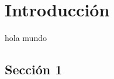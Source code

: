 \chapter{Introducción}
\label{cap:capitulo1}
\setcounter{page}{1}

hola mundo

\section{Sección 1}
\label{sec:miseccion}